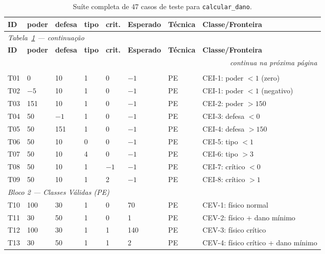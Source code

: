 \documentclass[conference, onecolumn]{IEEEtran}
\begin{document}
\begin{longtable}{@{}p{0.5cm}p{0.8cm}p{0.8cm}p{0.5cm}p{0.7cm}p{1.0cm}p{0.9cm}p{3.5cm}@{}}
\caption{Suíte completa de 47 casos de teste para \texttt{calcular\_dano}.}
\label{tab:suite} \\
\toprule
\textbf{ID} & \textbf{poder} & \textbf{defesa} & \textbf{tipo} & \textbf{crit.} & \textbf{Esperado} & \textbf{Técnica} & \textbf{Classe/Fronteira} \\
\midrule
\endfirsthead
\multicolumn{8}{l}{\small\textit{Tabela~\ref{tab:suite} — continuação}} \\
\toprule
\textbf{ID} & \textbf{poder} & \textbf{defesa} & \textbf{tipo} & \textbf{crit.} & \textbf{Esperado} & \textbf{Técnica} & \textbf{Classe/Fronteira} \\
\midrule
\endhead
\midrule
\multicolumn{8}{r}{\small\textit{continua na próxima página}} \\
\endfoot
\bottomrule
\endlastfoot
\multicolumn{8}{l}{\textit{Bloco 1 — Classes Inválidas (PE)}} \\
T01 & 0    & 10  & 1 & 0 & $-1$ & PE & CEI-1: poder $< 1$ (zero) \\
T02 & $-5$ & 10  & 1 & 0 & $-1$ & PE & CEI-1: poder $< 1$ (negativo) \\
T03 & 151  & 10  & 1 & 0 & $-1$ & PE & CEI-2: poder $> 150$ \\
T04 & 50   & $-1$& 1 & 0 & $-1$ & PE & CEI-3: defesa $< 0$ \\
T05 & 50   & 151 & 1 & 0 & $-1$ & PE & CEI-4: defesa $> 150$ \\
T06 & 50   & 10  & 0 & 0 & $-1$ & PE & CEI-5: tipo $< 1$ \\
T07 & 50   & 10  & 4 & 0 & $-1$ & PE & CEI-6: tipo $> 3$ \\
T08 & 50   & 10  & 1 & $-1$ & $-1$ & PE & CEI-7: crítico $< 0$ \\
T09 & 50   & 10  & 1 & 2 & $-1$ & PE & CEI-8: crítico $> 1$ \\
\midrule
\multicolumn{8}{l}{\textit{Bloco 2 — Classes Válidas (PE)}} \\
T10 & 100 & 30  & 1 & 0 & 70  & PE & CEV-1: físico normal \\
T11 & 30  & 50  & 1 & 0 & 1   & PE & CEV-2: físico + dano mínimo \\
T12 & 100 & 30  & 1 & 1 & 140 & PE & CEV-3: físico crítico \\
T13 & 30  & 50  & 1 & 1 & 2   & PE & CEV-4: físico crítico + dano mínimo \\

\end{longtable}
\end{document}
